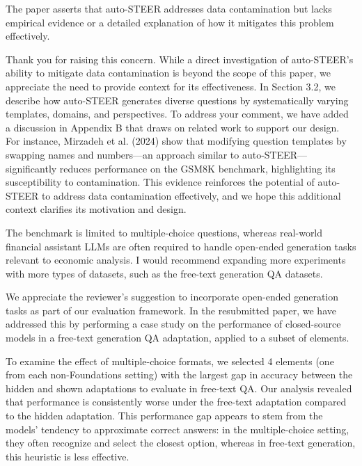 \documentclass[12pt]{rebuttal_style}
\begin{document}
\begin{revcomment}
    The paper asserts that auto-STEER addresses data contamination but lacks empirical evidence or a detailed explanation of how it mitigates this problem effectively.
\end{revcomment}
\begin{response}
Thank you for raising this concern. While a direct investigation of auto-STEER's ability to mitigate data contamination is beyond the scope of this paper, we appreciate the need to provide context for its effectiveness. In Section 3.2, we describe how auto-STEER generates diverse questions by systematically varying templates, domains, and perspectives. To address your comment, we have added a discussion in Appendix B that draws on related work to support our design. For instance, Mirzadeh et al. (2024) show that modifying question templates by swapping names and numbers—an approach similar to auto-STEER—significantly reduces performance on the GSM8K benchmark, highlighting its susceptibility to contamination. This evidence reinforces the potential of auto-STEER to address data contamination effectively, and we hope this additional context clarifies its motivation and design.
\end{response}

\begin{revcomment}
    The benchmark is limited to multiple-choice questions, whereas real-world financial assistant LLMs are often required to handle open-ended generation tasks relevant to economic analysis. I would recommend expanding more experiments with more types of datasets, such as the free-text generation QA datasets.
\end{revcomment}
\begin{response}
    We appreciate the reviewer's suggestion to incorporate open-ended generation tasks as part of our evaluation framework. In the resubmitted paper, we have addressed this by performing a case study on the performance of closed-source models in a free-text generation QA adaptation, applied to a subset of elements.
    
    To examine the effect of multiple-choice formats, we selected 4 elements (one from each non-Foundations setting) with the largest gap in accuracy between the hidden and shown adaptations to evaluate in free-text QA. Our analysis revealed that performance is consistently worse under the free-text adaptation compared to the hidden adaptation. This performance gap appears to stem from the models' tendency to approximate correct answers: in the multiple-choice setting, they often recognize and select the closest option, whereas in free-text generation, this heuristic is less effective.
\end{response}
\end{document}
